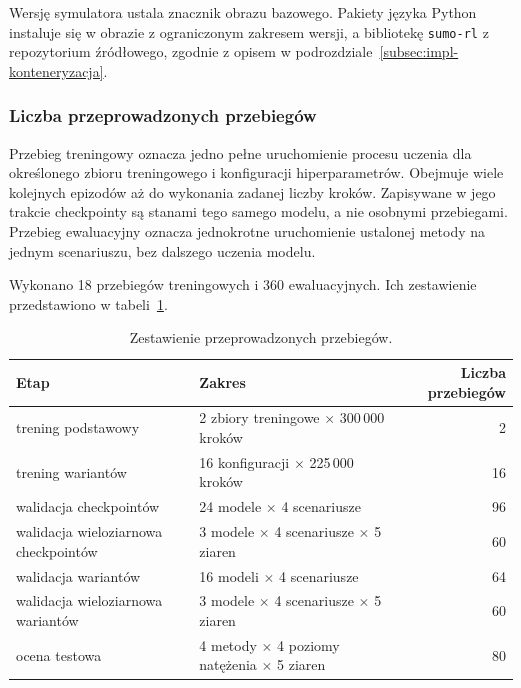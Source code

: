 Wersję symulatora ustala znacznik obrazu bazowego. Pakiety języka Python instaluje się w obrazie z ograniczonym zakresem wersji, a bibliotekę \texttt{sumo-rl} z repozytorium źródłowego, zgodnie z opisem w podrozdziale~\ref{subsec:impl-konteneryzacja}.

\subsubsection{Liczba przeprowadzonych przebiegów}
\label{subsubsec:liczba-przebiegow}

Przebieg treningowy oznacza jedno pełne uruchomienie procesu uczenia dla określonego zbioru treningowego i konfiguracji hiperparametrów. Obejmuje wiele kolejnych epizodów aż do wykonania zadanej liczby kroków. Zapisywane w jego trakcie checkpointy są stanami tego samego modelu, a nie osobnymi przebiegami. Przebieg ewaluacyjny oznacza jednokrotne uruchomienie ustalonej metody na jednym scenariuszu, bez dalszego uczenia modelu.

Wykonano 18 przebiegów treningowych i 360 ewaluacyjnych. Ich zestawienie przedstawiono w tabeli~\ref{tab:liczba-przebiegow}.

\begin{table}[!htbp] \centering
    \caption{Zestawienie przeprowadzonych przebiegów.}
    \label{tab:liczba-przebiegow}
    \footnotesize
    \setlength{\tabcolsep}{3pt}
    \begin{tabular}{| l | l | r |} \hline
        Etap & Zakres & Liczba przebiegów \\ \hline\hline
        trening podstawowy   & 2 zbiory treningowe $\times$ 300\,000 kroków & 2 \\ \hline
        trening wariantów    & 16 konfiguracji $\times$ 225\,000 kroków & 16 \\ \hline
        walidacja checkpointów & 24 modele $\times$ 4 scenariusze & 96 \\ \hline
        walidacja wieloziarnowa checkpointów & 3 modele $\times$ 4 scenariusze $\times$ 5 ziaren & 60 \\ \hline
        walidacja wariantów  & 16 modeli $\times$ 4 scenariusze & 64 \\ \hline
        walidacja wieloziarnowa wariantów & 3 modele $\times$ 4 scenariusze $\times$ 5 ziaren & 60 \\ \hline
        ocena testowa        & 4 metody $\times$ 4 poziomy natężenia $\times$ 5 ziaren & 80 \\ \hline
    \end{tabular}
\end{table}

